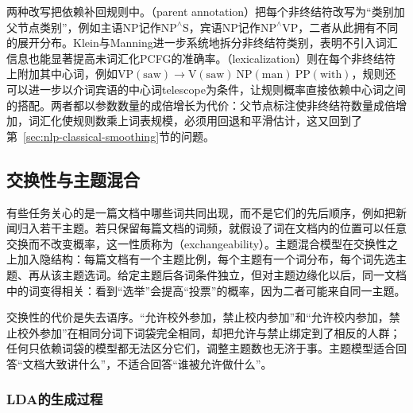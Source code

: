 两种改写把依赖补回规则中。（parent annotation）把每个非终结符改写为“类别加父节点类别”，例如主语NP记作$\mathrm{NP}^{\wedge}\mathrm S$，宾语NP记作$\mathrm{NP}^{\wedge}\mathrm{VP}$，二者从此拥有不同的展开分布。Klein与Manning进一步系统地拆分非终结符类别，表明不引入词汇信息也能显著提高未词汇化PCFG的准确率。（lexicalization）则在每个非终结符上附加其中心词，例如$\mathrm{VP}(\text{saw})\to\mathrm V(\text{saw})\ \mathrm{NP}(\text{man})\ \mathrm{PP}(\text{with})$，规则还可以进一步以介词宾语的中心词telescope为条件，让规则概率直接依赖中心词之间的搭配。两者都以参数数量的成倍增长为代价：父节点标注使非终结符数量成倍增加，词汇化使规则数乘上词表规模，必须用回退和平滑估计，这又回到了第~\ref{sec:nlp-classical-smoothing}节的问题。

\subsection{交换性与主题混合}
\label{sec:nlp-classical-topic}

有些任务关心的是一篇文档中哪些词共同出现，而不是它们的先后顺序，例如把新闻归入若干主题。若只保留每篇文档的词频，就假设了词在文档内的位置可以任意交换而不改变概率，这一性质称为（exchangeability）。主题混合模型在交换性之上加入隐结构：每篇文档有一个主题比例，每个主题有一个词分布，每个词先选主题、再从该主题选词。给定主题后各词条件独立，但对主题边缘化以后，同一文档中的词变得相关：看到“选举”会提高“投票”的概率，因为二者可能来自同一主题。

交换性的代价是失去语序。“允许校外参加，禁止校内参加”和“允许校内参加，禁止校外参加”在相同分词下词袋完全相同，却把允许与禁止绑定到了相反的人群；任何只依赖词袋的模型都无法区分它们，调整主题数也无济于事。主题模型适合回答“文档大致讲什么”，不适合回答“谁被允许做什么”。

\subsubsection{LDA的生成过程}
\label{sec:nlp-classical-lda}

